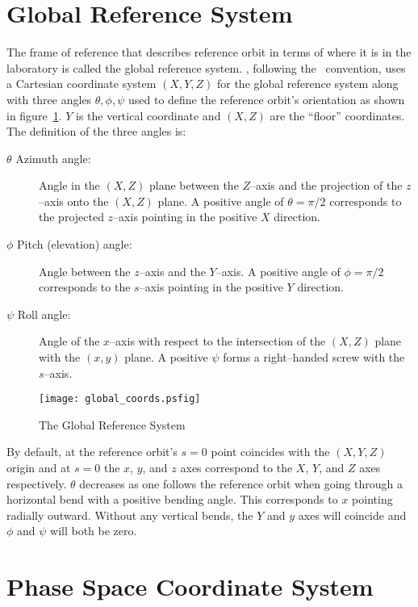\section{Global Reference System}
\label{s:global}

The frame of reference that describes reference orbit in terms of where it
is in the laboratory is called the global reference system.
\bmad, following the \mad\ convention, uses a Cartesian coordinate system
$(X, Y, Z)$ for the global reference system along with three angles
$\theta, \phi, \psi$ used to define the reference orbit's orientation
as shown in figure~\ref{f:global_coords}. $Y$ is the vertical
coordinate and $(X, Z)$ are the ``floor'' coordinates.  The definition
of the three angles is:
\begin{description}
\item[$\theta$ Azimuth angle:] Angle in the $(X, Z)$ plane 
between the $Z$--axis and the projection of the $z$--axis onto the
$(X, Z)$ plane. A positive angle of $\theta = \pi/2$ corresponds to the
projected $z$--axis pointing in the positive $X$ direction.
\item[$\phi$ Pitch (elevation) angle:] Angle between the $z$--axis 
and the $Y$--axis. A positive angle of $\phi = \pi/2$ corresponds to
the $s$--axis pointing in the positive $Y$ direction.
\item[$\psi$ Roll angle:] Angle of the $x$--axis with respect 
to the intersection of the $(X, Z)$ plane with the $(x, y)$ plane. A
positive $\psi$ forms a right--handed screw with the $s$--axis.
\end{description}

\begin{figure}
\centering
\texttt{[image: global\_coords.psfig]}
\caption{The Global Reference System}
\label{f:global_coords}
\end{figure}

By default, at the reference orbit's $s = 0$ point coincides with the
$(X, Y, Z)$ origin and at $s = 0$ the $x$, $y$, and $z$ axes
correspond to the $X$, $Y$, and $Z$ axes respectively. $\theta$
decreases as one follows the reference orbit when going through a
horizontal bend with a positive bending angle. This corresponds to $x$
pointing radially outward. Without any vertical bends, the $Y$ and $y$
axes will coincide and $\phi$ and $\psi$ will both be zero.

\section{Phase Space Coordinate System}

